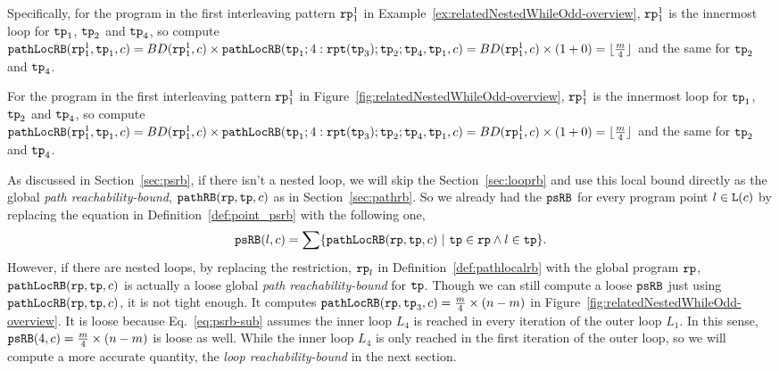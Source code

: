 Specifically, for the program in the first interleaving pattern $\mathtt{rp}_1^1$ in Example~\ref{ex:relatedNestedWhileOdd-overview}, $\mathtt{rp}_1^1$ is the innermost loop for $\mathtt{tp}_1$, $\mathtt{tp}_2$ and $\mathtt{tp}_4$, 
so compute $\mathtt{pathLocRB}(\mathtt{rp}_1^1, \mathtt{tp}_1, c) = BD(\mathtt{rp}_1^1, c) \times \mathtt{pathLocRB}(\mathtt{tp}_1; 4:\mathtt{rpt}(\mathtt{tp}_3); \mathtt{tp}_2; \mathtt{tp}_4, \mathtt{tp}_1, c)
= BD(\mathtt{rp}_1^1, c) \times (1 + 0) = \lfloor \frac{m}{4} \rfloor $ and the same for $\mathtt{tp}_2$ and $\mathtt{tp}_4$.


For the program in the first interleaving pattern $\mathtt{rp}_1^1$ in Figure~\ref{fig:relatedNestedWhileOdd-overview}, $\mathtt{rp}_1^1$ is the innermost loop for $\mathtt{tp}_1$, $\mathtt{tp}_2$ and $\mathtt{tp}_4$, 
 so compute $\mathtt{pathLocRB}(\mathtt{rp}_1^1, \mathtt{tp}_1, c) = BD(\mathtt{rp}_1^1, c) \times \mathtt{pathLocRB}(\mathtt{tp}_1; 4:\mathtt{rpt}(\mathtt{tp}_3); \mathtt{tp}_2; \mathtt{tp}_4, \mathtt{tp}_1, c)
 = BD(\mathtt{rp}_1^1, c) \times (1 + 0) = \lfloor \frac{m}{4} \rfloor $ and the same for $\mathtt{tp}_2$ and $\mathtt{tp}_4$.

 As discussed in Section~\ref{sec:psrb}, if there isn't a nested loop, we will skip the Section~\ref{sec:looprb} and use this local bound directly as the global \emph{path reachability-bound}, $\mathtt{pathRB}(\mathtt{rp}, \mathtt{tp}, c)$ as in Section~\ref{sec:pathrb}. 
 So we already had the $\mathtt{psRB}$ for every program point $l \in \mathtt{L}(c)$ by replacing the equation in Definition~\ref{def:point_psrb} with the following one,
 \begin{equation}
 \label{eq:psrb-sub}
 \psRB(l, c) = 
 \sum
 \left\{ \outinB(\rprog, \tpath, c) ~\vert~ \tpath \in \rprog \land 
 l \in \tpath \right\}.
 \end{equation}
 However, if there are nested loops, 
 by replacing the restriction, $\mathtt{rp}_l$ in Definition~\ref{def:pathlocalrb} with the global program $\mathtt{rp}$, $\mathtt{pathLocRB}(\mathtt{rp}, \mathtt{tp}, c)$ is actually a loose global \emph{path reachability-bound} for $\mathtt{tp}$. Though we can still compute a loose $\mathtt{psRB}$ just using $\mathtt{pathLocRB}(\mathtt{rp}, \mathtt{tp}, c)$, it is not tight enough. 
It computes
$\mathtt{pathLocRB}(\mathtt{rp}, \mathtt{tp}_3, c) = \frac{m}{4} \times (n - m)$ in Figure~\ref{fig:relatedNestedWhileOdd-overview}.
It is loose because Eq.~\ref{eq:psrb-sub} assumes the inner loop $L_4$ is reached in every iteration of the outer loop $L_1$. In this sense, $\mathtt{psRB}(4, c) = \frac{m}{4} \times (n - m)$ is loose as well.
While the inner loop $L_4$ is only reached in the first iteration of the outer loop,
so we will compute a more accurate quantity, the \emph{loop reachability-bound} in the next section.